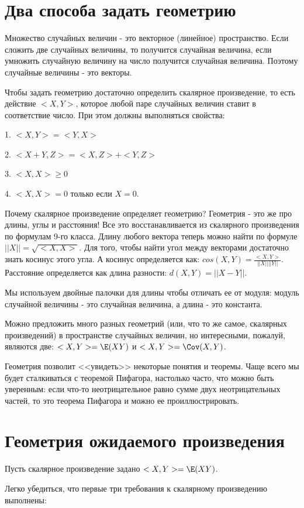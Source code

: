 
\section{Два способа задать геометрию}

Множество случайных величин - это векторное (линейное) пространство. Если сложить две случайных величины, то получится случайная величина, если умножить случайную величину на число получится случайная величина. Поэтому случайные величины - это векторы.

Чтобы задать геометрию достаточно определить скалярное произведение, то есть действие $<X,Y>$, которое любой паре случайных величин ставит в соответствие число. При этом должны выполняться свойства:

1. $<X,Y>=<Y,X>$

2. $<X+Y,Z>=<X,Z>+<Y,Z>$

3. $<X,X>\geq 0$

4. $<X,X>=0$ только если $X=0$.

Почему скалярное произведение определяет геометрию? Геометрия - это же про длины, углы и расстояния! Все это восстанавливается из скалярного произведения по формулам 9-го класса. Длину любого вектора теперь можно найти по формуле $||X||=\sqrt{<X,X>}$.
Для того, чтобы найти угол между векторами достаточно знать косинус этого угла. А косинус определяется как: $cos(X,Y)=\frac{<X,Y>}{||X||||Y||}$. Расстояние определяется как длина разности: $d(X,Y)=||X-Y||$.

Мы используем двойные палочки для длины чтобы отличать ее от модуля: модуль случайной величины - это случайная величина, а длина - это константа.

Можно предложить много разных геометрий (или, что то же самое, скалярных произведений) в пространстве случайных величин, но интересными, пожалуй, являются две: $<X,Y>=\E(XY)$ и $<X,Y>=\Cov(X,Y)$.

Геометрия позволит <<увидеть>> некоторые понятия и теоремы. Чаще всего мы будет сталкиваться с теоремой Пифагора, настолько часто, что можно быть уверенным: если что-то неотрицательное равно сумме двух неотрицательных частей, то это теорема Пифагора и можно ее проиллюстрировать.

\section{Геометрия ожидаемого произведения}
Пусть скалярное произведение задано $<X,Y>=\E(XY)$.

Легко убедиться, что первые три требования к скалярному произведению выполнены:

